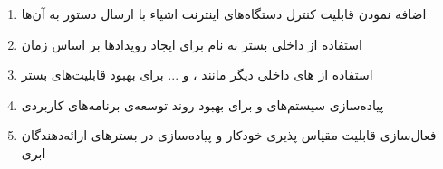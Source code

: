 \begin{enumerate}

	\item اضافه نمودن قابلیت کنترل دستگاه‌های اینترنت اشیاء با ارسال دستور به آن‌ها
	
	\item استفاده از  داخلی بستر  به نام  برای ایجاد رویدادها بر اساس زمان
	
	\item استفاده از  های داخلی دیگر مانند ،  و ... برای بهبود قابلیت‌های بستر

	\item پیاده‌سازی سیستم‌های  و  برای بهبود روند توسعه‌ی برنامه‌های کاربردی

	\item فعال‌سازی قابلیت مقیاس پذیری خودکار و پیاده‌سازی در بستر‌های ارائه‌دهندگان ابری
	
\end{enumerate}


